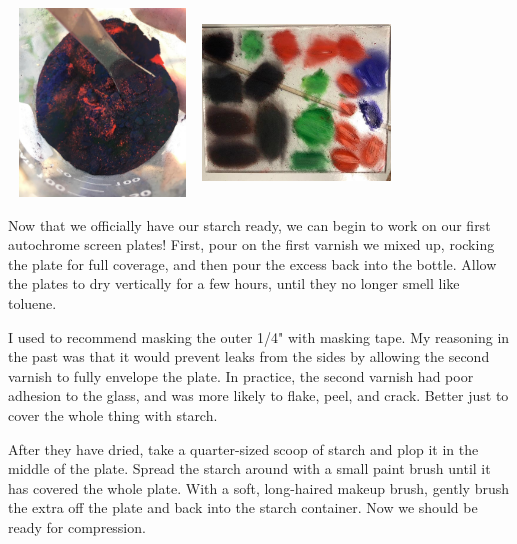 \documentclass[11pt]{article}
\begin{document}
\begin{center}
\includegraphics[width=5cm, height=5cm]{img/part1_15.jpg}
\includegraphics[width=5cm, height=5cm]{img/part1_16.jpg}
\end{center}

Now that we officially have our starch ready, we can begin to work on our first autochrome screen plates! First, pour on the first varnish we mixed up, rocking the plate for full coverage, and then pour the excess back into the bottle. Allow the plates to dry vertically for a few hours, until they no longer smell like toluene.\newline

I used to recommend masking the outer 1/4" with masking tape. My reasoning in the past was that it would prevent leaks from the sides by allowing the second varnish to fully envelope the plate. In practice, the second varnish had poor adhesion to the glass, and was more likely to flake, peel, and crack. Better just to cover the whole thing with starch.\newline

After they have dried, take a quarter-sized scoop of starch and plop it in the middle of the plate. Spread the starch around with a small paint brush until it has covered the whole plate. With a soft, long-haired makeup brush, gently brush the extra off the plate and back into the starch container. Now we should be ready for compression.\newline
\end{document}
